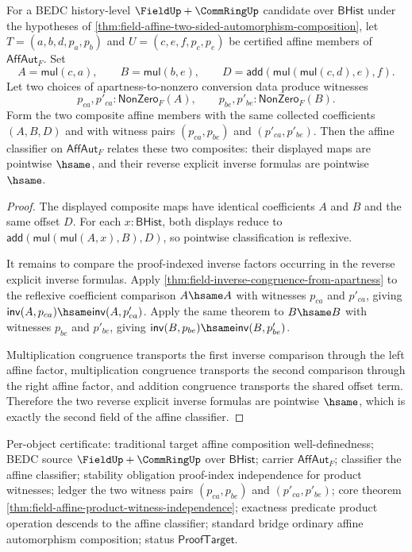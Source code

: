 \begin{theorem}
\label{thm:field-affine-product-witness-independence}
For a BEDC history-level $\FieldUp+\CommRingUp$ candidate over
$\mathsf{BHist}$ under the hypotheses of
\autoref{thm:field-affine-two-sided-automorphism-composition}, let
$T=(a,b,d,p_a,p_b)$ and $U=(c,e,f,p_c,p_e)$ be certified affine members of
$\mathsf{AffAut}_F$. Set
$$
A=\mathsf{mul}(c,a),
\qquad
B=\mathsf{mul}(b,e),
\qquad
D=\mathsf{add}(\mathsf{mul}(\mathsf{mul}(c,d),e),f).
$$
Let two choices of apartness-to-nonzero conversion data produce witnesses
$$
p_{ca},p'_{ca}:\mathsf{NonZero}_F(A),
\qquad
p_{be},p'_{be}:\mathsf{NonZero}_F(B).
$$
Form the two composite affine members with the same collected coefficients
$(A,B,D)$ and with witness pairs $(p_{ca},p_{be})$ and
$(p'_{ca},p'_{be})$. Then the affine classifier on $\mathsf{AffAut}_F$
relates these two composites: their displayed maps are pointwise $\hsame$,
and their reverse explicit inverse formulas are pointwise $\hsame$.
\end{theorem}
\begin{proof}
The displayed composite maps have identical coefficients $A$ and $B$ and the
same offset $D$. For each $x:\mathsf{BHist}$, both displays reduce to
$\mathsf{add}(\mathsf{mul}(\mathsf{mul}(A,x),B),D)$, so pointwise
classification is reflexive.

It remains to compare the proof-indexed inverse factors occurring in the
reverse explicit inverse formulas. Apply
\autoref{thm:field-inverse-congruence-from-apartness} to the reflexive
coefficient comparison $A\hsame A$ with witnesses $p_{ca}$ and $p'_{ca}$,
giving $\mathsf{inv}(A,p_{ca})\hsame\mathsf{inv}(A,p'_{ca})$. Apply the same
theorem to $B\hsame B$ with witnesses $p_{be}$ and $p'_{be}$, giving
$\mathsf{inv}(B,p_{be})\hsame\mathsf{inv}(B,p'_{be})$.

Multiplication congruence transports the first inverse comparison through the
left affine factor, multiplication congruence transports the second comparison
through the right affine factor, and addition congruence transports the shared
offset term. Therefore the two reverse explicit inverse formulas are
pointwise $\hsame$, which is exactly the second field of the affine
classifier.
\end{proof}

Per-object certificate: traditional target affine composition
well-definedness; BEDC source $\FieldUp+\CommRingUp$ over $\mathsf{BHist}$;
carrier $\mathsf{AffAut}_F$; classifier the affine classifier; stability
obligation proof-index independence for product witnesses; ledger the two
witness pairs $(p_{ca},p_{be})$ and $(p'_{ca},p'_{be})$; core theorem
\autoref{thm:field-affine-product-witness-independence}; exactness predicate
product operation descends to the affine classifier; standard bridge ordinary
affine automorphism composition; status $\mathsf{ProofTarget}$.

